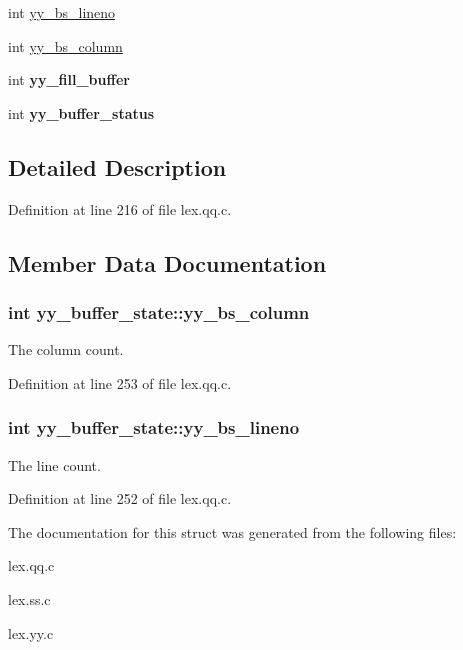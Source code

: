 \begin{DoxyCompactItemize}
\item 
int \hyperlink{structyy__buffer__state_a818e94bc9c766e683c60df1e9fd01199}{yy\_\-bs\_\-lineno}
\item 
int \hyperlink{structyy__buffer__state_a10c4fcd8be759e6bf11e6d3e8cdb0307}{yy\_\-bs\_\-column}
\item 
\hypertarget{structyy__buffer__state_a63d2afbb1d79a3fc63df9e12626f827d}{
int {\bfseries yy\_\-fill\_\-buffer}}
\label{structyy__buffer__state_a63d2afbb1d79a3fc63df9e12626f827d}

\item 
\hypertarget{structyy__buffer__state_a70fd925d37a2f0454fbd0def675d106c}{
int {\bfseries yy\_\-buffer\_\-status}}
\label{structyy__buffer__state_a70fd925d37a2f0454fbd0def675d106c}

\end{DoxyCompactItemize}


\subsection{Detailed Description}


Definition at line 216 of file lex.qq.c.



\subsection{Member Data Documentation}
\hypertarget{structyy__buffer__state_a10c4fcd8be759e6bf11e6d3e8cdb0307}{
\subsubsection[{yy\_\-bs\_\-column}]{\setlength{\rightskip}{0pt plus 5cm}int {\bf yy\_\-buffer\_\-state::yy\_\-bs\_\-column}}}
\label{structyy__buffer__state_a10c4fcd8be759e6bf11e6d3e8cdb0307}
The column count. 

Definition at line 253 of file lex.qq.c.

\hypertarget{structyy__buffer__state_a818e94bc9c766e683c60df1e9fd01199}{
\subsubsection[{yy\_\-bs\_\-lineno}]{\setlength{\rightskip}{0pt plus 5cm}int {\bf yy\_\-buffer\_\-state::yy\_\-bs\_\-lineno}}}
\label{structyy__buffer__state_a818e94bc9c766e683c60df1e9fd01199}
The line count. 

Definition at line 252 of file lex.qq.c.



The documentation for this struct was generated from the following files:\begin{DoxyCompactItemize}
\item 
lex.qq.c\item 
lex.ss.c\item 
lex.yy.c\end{DoxyCompactItemize}
